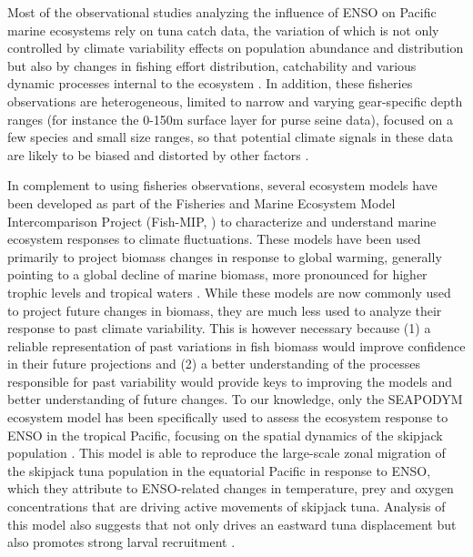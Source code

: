 Most of the observational studies analyzing the influence of ENSO on Pacific marine ecosystems rely on tuna catch data, the variation of which is not only controlled by climate variability effects on population abundance and distribution but also by changes in fishing effort distribution, catchability and various dynamic processes internal to the ecosystem \citep{hobdayDetectingClimateImpacts2013}. In addition, these fisheries observations are heterogeneous, limited to narrow and varying gear-specific depth ranges (for instance the 0-150m surface layer for purse seine data), focused on a few species and small size ranges, so that potential climate signals in these data are likely to be biased and distorted by other factors \citep{hobdayDetectingClimateImpacts2013}. 

In complement to using fisheries observations, several ecosystem models have been developed as part of the Fisheries and Marine Ecosystem Model Intercomparison Project (Fish-MIP, \citealp{tittensorProtocolIntercomparisonMarine2018}) to characterize and understand marine ecosystem responses to climate fluctuations. These models have been used primarily to project biomass changes in response to global warming, generally pointing to a global decline of marine biomass, more pronounced for higher trophic levels and tropical waters \citep{lotzeGlobalEnsembleProjections2019, tittensorNextgenerationEnsembleProjections2021}. While these models are now commonly used to project future  changes in biomass, they are much less used to analyze their response to past climate variability. This is however necessary because (1) a reliable representation of past variations in fish biomass would improve confidence in their future projections and (2) a better understanding of the processes responsible for past variability would provide keys to improving the models and better understanding of future changes. To our knowledge, only the SEAPODYM \citep{lehodeySpatialEcosystemPopulations2008} ecosystem model has been specifically used to assess the ecosystem response to ENSO in the tropical Pacific, focusing on the spatial dynamics of the skipjack population \citep{lehodeyPelagicEcosystemTropical2001}. This model is able to reproduce the large-scale zonal migration of the skipjack tuna population in the equatorial Pacific in response to ENSO, which they attribute to ENSO-related changes in temperature, prey and oxygen concentrations that are driving active movements of skipjack tuna. Analysis of this model also suggests that \nino{} not only drives an eastward tuna displacement but also promotes  strong larval recruitment \citep{seninaParameterEstimationBasinscale2008}. 

